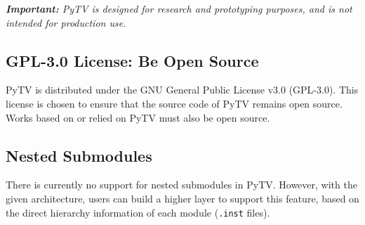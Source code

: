 \textit{\textbf{Important:}
PyTV is designed for research and prototyping purposes,
and is not intended for production use.}

\subsection{GPL-3.0 License: Be Open Source}
PyTV is distributed under the GNU General Public License v3.0 (GPL-3.0).
This license is chosen to ensure that the source code of PyTV remains open source.
Works based on or relied on PyTV must also be open source.

\subsection{Nested Submodules}
There is currently no support for nested submodules in PyTV.
However, with the given architecture,
users can build a higher layer to support this feature,
based on the direct hierarchy information of each module (\texttt{.inst} files).

